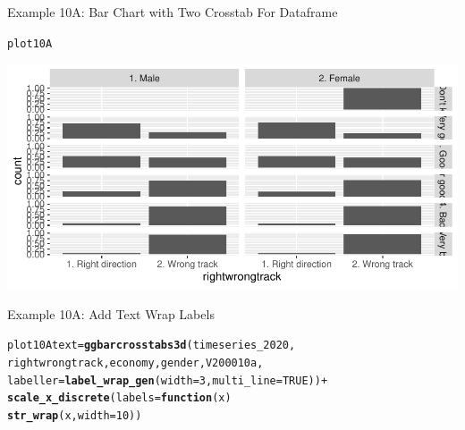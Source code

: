 \documentclass{beamer}\usepackage[]{graphicx}\usepackage[]{xcolor}
\makeatletter
\newcommand{\hlnum}[1]{\textcolor[rgb]{0.686,0.059,0.569}{#1}}%
\newcommand{\hlopt}[1]{\textcolor[rgb]{0,0,0}{#1}}%
\newcommand{\hlstd}[1]{\textcolor[rgb]{0.345,0.345,0.345}{#1}}%
\newcommand{\hlkwa}[1]{\textcolor[rgb]{0.161,0.373,0.58}{\textbf{#1}}}%
\newcommand{\hlkwb}[1]{\textcolor[rgb]{0.69,0.353,0.396}{#1}}%
\newcommand{\hlkwc}[1]{\textcolor[rgb]{0.333,0.667,0.333}{#1}}%
\newcommand{\hlkwd}[1]{\textcolor[rgb]{0.737,0.353,0.396}{\textbf{#1}}}%
\newenvironment{kframe}{%
 \def\at@end@of@kframe{}%
 \ifinner\ifhmode%
  \def\at@end@of@kframe{\end{minipage}}%
  \begin{minipage}{\columnwidth}%
 \fi\fi%
 \def\FrameCommand##1{\hskip\@totalleftmargin \hskip-\fboxsep
 \colorbox{shadecolor}{##1}\hskip-\fboxsep
     \hskip-\linewidth \hskip-\@totalleftmargin \hskip\columnwidth}%
 \MakeFramed {\advance\hsize-\width
   \@totalleftmargin\z@ \linewidth\hsize
   \@setminipage}}%
 {\par\unskip\endMakeFramed%
 \at@end@of@kframe}
\newenvironment{knitrout}{}{} %
\makeatother
\begin{document}
\begin{frame}[fragile]{Example 10A: Bar Chart with Two Crosstab For Dataframe}

\begin{knitrout}
\color{fgcolor}\begin{kframe}
\begin{alltt}
\hlstd{plot10A}
\end{alltt}
\end{kframe}
\includegraphics[width=0.95\linewidth]{figure/unnamed-chunk-58-1} 
\end{knitrout}
\end{frame}

\begin{frame}[fragile]{Example 10A: Add Text Wrap Labels}

\begin{knitrout}
\color{fgcolor}\begin{kframe}
\begin{alltt}
\hlstd{plot10Atext} \hlkwb{=} \hlkwd{ggbarcrosstabs3d}\hlstd{(timeseries_2020,}
\hlstd{rightwrongtrack,economy,gender, V200010a,}
\hlkwc{labeller} \hlstd{=} \hlkwd{label_wrap_gen}\hlstd{(}\hlkwc{width} \hlstd{=} \hlnum{3}\hlstd{,} \hlkwc{multi_line} \hlstd{=} \hlnum{TRUE}\hlstd{))} \hlopt{+}
  \hlkwd{scale_x_discrete}\hlstd{(}\hlkwc{labels} \hlstd{=} \hlkwa{function}\hlstd{(}\hlkwc{x}\hlstd{)}
    \hlkwd{str_wrap}\hlstd{(x,} \hlkwc{width} \hlstd{=} \hlnum{10}\hlstd{))}
\end{alltt}
\end{kframe}
\end{knitrout}
\end{frame}
\end{document}
